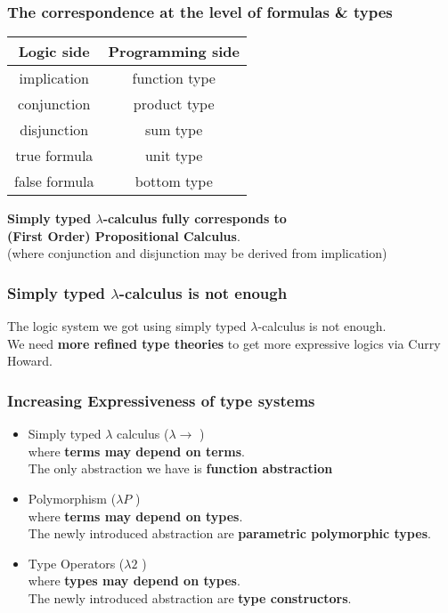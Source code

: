 \begin{frame}
\frametitle{The correspondence at the level of formulas \& types}
\begin{center}
\begin{tabular}{|c|c|}
\hline 
\textbf{Logic side} & \textbf{Programming side}\\
\hline
implication & function type \\
\hline
conjunction & product type \\
\hline
disjunction & sum type \\
\hline
true formula & unit type \\
\hline
false formula &	bottom type \\
\hline
\end{tabular}
\end{center}
\textbf{Simply typed $\lambda$-calculus fully corresponds to\\ (First Order) Propositional Calculus}.\\
(where conjunction and disjunction may be derived from implication)
\end{frame}

\begin{frame}
\frametitle{Simply typed $\lambda$-calculus is not enough}
The logic system we got using simply typed $\lambda$-calculus is not enough.\\
We need \textbf{more refined type theories} to get more expressive logics via Curry Howard.
\end{frame}

\begin{frame}
\frametitle{Increasing Expressiveness of type systems} 
\begin{itemize}
	\item Simply typed $ \lambda $ calculus ($\lambda \rightarrow $ ) \\
		  where \textbf{terms may depend on terms}. \\
		  The only abstraction we have is \textbf{function abstraction}
	\pause
	\item Polymorphism ($\lambda P$ )\\ 
		  where \textbf{terms may depend on types}.\\
		  The newly introduced abstraction are \textbf{parametric polymorphic types}.
	\pause
	\item Type Operators ($\lambda 2 $ )\\
		  where \textbf{types may depend on types}.\\
		  The newly introduced abstraction are \textbf{type constructors}.
\end{itemize}
\end{frame}

